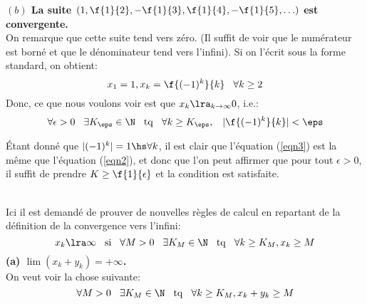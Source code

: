 \vspace{1cm}
{\bf $(b)$ La suite $(1, \f{1}{2}, -\f{1}{3},  \f{1}{4}, -\f{1}{5}, \ldots )$ est convergente.}\\

\noindent On remarque que cette suite tend vers zéro. (Il suffit de voir que le numérateur est borné et que le dénominateur  tend vers l'infini). Si on l'écrit  sous la forme standard, on obtient:                 
              \[x_1 = 1, x_k = \f{(-1)^k}{k} \hspace{0.3cm} \forall k\geq 2\] 
Donc, ce que nous voulons voir est que $x_k \lra_{k\rightarrow  \infty} 0$, i.e.: 
   \begin{equation}\label{eqn3}\forall \epsilon >0 \hspace{0,3cm} \exists K_\eps \in \N \hspace{0,3cm} {\rm tq}                       
       \hspace{0,3cm}  \forall k\geq K_\eps,  \hspace{0,3cm} |\f{(-1)^k}{k}|<\eps\end{equation}
       
\noindent Étant donné que $|(-1)^k| = 1 \hs \forall k$, il est clair que l'équation (\ref{eqn3}) est la même que l'équation (\ref{eqn2}), et donc que l'on peut affirmer que pour tout $\epsilon > 0$, il suffit de prendre $K\geq \f{1}{\epsilon}$ et la condition est satisfaite.

\\

Ici il est demandé de prouver de nouvelles règles de calcul en repartant de la définition de la convergence vers l'infini:
\begin{equation}
 \label{eqnconvinfGene} x_k \lra \infty \hspace{0.3cm} {\rm si} \hspace{0.3cm}  \forall M > 0 \hspace{0.3cm} \exists K_M \in \N \hspace{0.3cm} {\rm tq} \hspace{0.3cm} \forall k \geq K_M, x_k \geq M \end{equation}
{\bf (a) $ \lim(x_k+y_k) = +\infty$.}\\

\noindent On veut voir  la chose suivante:
\begin{equation}
 \label{eqnconvinfCasA}  \forall M > 0 \hspace{0.3cm} \exists K_M \in \N \hspace{0.3cm} {\rm tq} \hspace{0.3cm} \forall k \geq K_M, x_k + y_k \geq M \end{equation}

